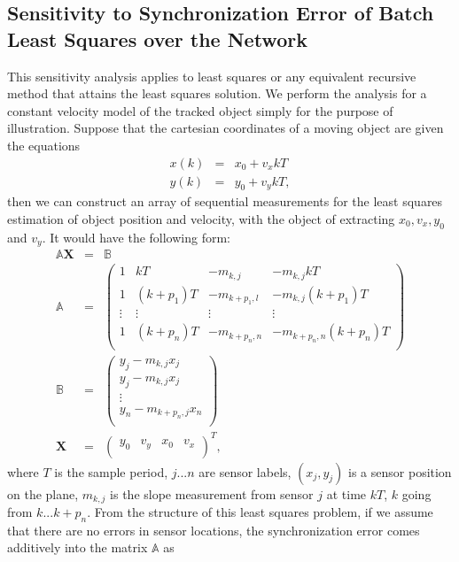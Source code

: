 \subsection{Sensitivity to Synchronization Error of Batch Least Squares over the Network}\label{sec:least_square}
This sensitivity analysis applies to least squares or any equivalent
recursive method that attains the least squares solution. We perform
the analysis for a constant velocity model of the tracked object
simply for the purpose of illustration. Suppose that the cartesian
coordinates of a moving object are given the equations
\begin{eqnarray}
x(k)&=&x_0+v_xkT\label{eqn:xconstvel}\\
y(k)&=&y_0+v_ykT\label{eqn:xconstvel},
\end{eqnarray}
then we can construct an array of sequential measurements for the least squares estimation of object position and velocity, with the object of extracting $x_0, v_x, y_0$ and $v_y$. It would have the following form:
\begin{eqnarray}
\mathbb{A}\mathbf{X}&=&\mathbb{B}\label{eqn:batchls1}\\
\mathbb{A}&=&\begin{pmatrix}
               1 & kT & -m_{k,j} &-m_{k,j}kT  \\
               1 & (k+p_1)T & -m_{k+p_1,l} & -m_{k,j}(k+p_1)T \\
               \vdots & \vdots & \vdots & \vdots \\
               1 & (k+p_n)T & -m_{k+p_n,n} & -m_{k+p_n,n}(k+p_n)T \\
             \end{pmatrix}\nonumber\\
\mathbb{B}&=&\begin{pmatrix}
               y_j-m_{k,j}x_j \\
               y_j-m_{k,j}x_j \\
               \vdots \\
               y_n-m_{k+p_n,j}x_n \\
             \end{pmatrix}\nonumber\\
\mathbf{X}&=&\begin{pmatrix}
               y_0 & v_y & x_0 & v_x \\
             \end{pmatrix}^T\nonumber,
\end{eqnarray}
where $T$ is the sample period, $j...n$ are sensor labels, $(x_j,y_j)$ is a sensor position on the plane, $m_{k,j}$ is the slope measurement from sensor $j$ at time $kT$, $k$ going from $k...k+p_n$. From the structure of this least squares problem, if we assume that there are no errors in sensor locations, the synchronization error comes additively into the matrix $\mathbb{A}$ as
